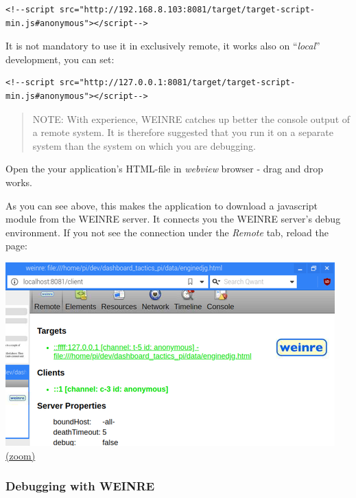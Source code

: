 \documentclass[11pt]{article}
\begin{document}
    \begin{verbatim}
<!--script src="http://192.168.8.103:8081/target/target-script-min.js#anonymous"></script-->
\end{verbatim}

    It is not mandatory to use it in exclusively remote, it works also on
``\emph{local}'' development, you can set:

    \begin{verbatim}
<!--script src="http://127.0.0.1:8081/target/target-script-min.js#anonymous"></script-->
\end{verbatim}

    \begin{quote}
NOTE: With experience, WEINRE catches up better the console output of a
remote system. It is therefore suggested that you run it on a separate
system than the system on which you are debugging.
\end{quote}

    Open the your application's HTML-file in \emph{webview} browser - drag
and drop works.

    As you can see above, this makes the application to download a
javascript module from the WEINRE server. It connects you the WEINRE
server's debug environment. If you not see the connection under the
\emph{Remote} tab, reload the page:

    \includegraphics{2019-12-25_weinre_server_connected_to_local_host_client.png}
\href{pdf/2019-12-25_weinre_server_connected_to_local_host_client.png}{(zoom)}

    \hypertarget{debugging-with-weinre}{%
\subsubsection{Debugging with WEINRE}\label{debugging-with-weinre}}
\end{document}
